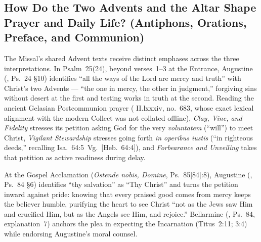 \subsection{How Do the Two Advents and the Altar Shape Prayer and Daily Life? (Antiphons, Orations, Preface, and Communion)}

The Missal's shared Advent texts receive distinct emphases across the three interpretations. In Psalm~25(24), beyond verses~1--3 at the Entrance, Augustine (, Ps.~24 §10) identifies ``all the ways of the Lord are mercy and truth'' with Christ's two Advents --- ``the one in mercy, the other in judgment,'' forgiving sins without desert at the first and testing works in truth at the second. Reading the ancient Gelasian Postcommunion prayer ( II.lxxxiv, no.~683, whose exact lexical alignment with the modern Collect was not collated offline), \emph{Clay, Vine, and Fidelity} stresses its petition asking God for the very \emph{voluntatem} (``will'') to meet Christ, \emph{Vigilant Stewardship} stresses going forth \emph{in operibus iustis} (``in righteous deeds,'' recalling Isa.~64:5~Vg.\ [Heb.~64:4]), and \emph{Forbearance and Unveiling} takes that petition as active readiness during delay.

At the Gospel Acclamation (\emph{Ostende nobis, Domine}, Ps.~85[84]:8), Augustine (, Ps.~84 §6) identifies ``thy salvation'' as ``Thy Christ'' and turns the petition inward against pride: knowing that every praised good comes from mercy keeps the believer humble, purifying the heart to see Christ ``not as the Jews saw Him and crucified Him, but as the Angels see Him, and rejoice.'' Bellarmine (, Ps.~84, explanation~7) anchors the plea in expecting the Incarnation (Titus~2:11; 3:4) while endorsing Augustine's moral counsel.

